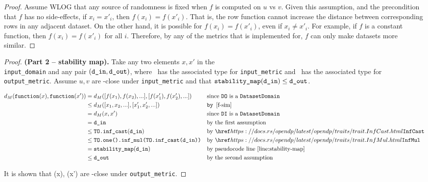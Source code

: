 \documentclass{article}
\begin{document}
\begin{proof} 
    Assume WLOG that any source of randomness is fixed when $f$ is computed on $u$ vs $v$. 
    Given this assumption, and the precondition that $f$ has no side-effects, 
    if $x_i = x'_i$, then $f(x_i) = f(x'_i)$.  
    That is, the row function cannot increase the distance between corresponding rows in any adjacent dataset. 
    On the other hand, it is possible for $f(x_i) = f(x'_i)$, even if $x_i \neq x'_i$. 
    For example, if $f$ is a constant function, then $f(x_i) = f(x'_i)$ for all $i$. 
    Therefore, by any of the metrics that  is implemented for, 
    $f$ can only make datasets more similar. 
\end{proof} 
 
\begin{proof} \textbf{(Part 2 -- stability map).}  
    Take any two elements $x, x'$ in the \\\texttt{input\_domain} and any pair $(\texttt{d\_in}, \texttt{d\_out})$,  
    where \din\ has the associated type for \texttt{input\_metric} and \dout\ has the associated type for \texttt{output\_metric}. 
    Assume $u, v$ are \din-close under \texttt{input\_metric} and that $\texttt{stability\_map}(\texttt{d\_in}) \leq \texttt{d\_out}$.  
     
    \begin{align*} 
        d_{M}(\function(x), \function(x')) &= d_{M}([f(x_1), f(x_2), ...], [f(x'_1), f(x'_2), ...])  && \text{since \texttt{DO} is a }\texttt{DatasetDomain}\\ 
        &\le d_{M}([x_1, x_2, ...], [x'_1, x'_2, ...]) && \texttt{by } \ref{f-sim} \\ 
        &= d_{M}(x, x')  && \text{since \texttt{DI} is a }\texttt{DatasetDomain} \\ 
        &= \din &&\text{by the first assumption} \\ 
        &\leq \texttt{TO.inf\_cast}(\din) &&\text{by } \rustdoc{traits/trait}{InfCast} \\ 
        &\leq \texttt{TO.one().inf\_mul(TO.inf\_cast(\din))} &&\text{by } \rustdoc{traits/trait}{InfMul} \\ 
        &=\texttt{stability\_map}(\din) &&\text{by pseudocode line } \ref{line:stability-map} \\ 
        &\leq \dout &&\text{by the second assumption} 
    \end{align*} 
 
    It is shown that \function(x), \function(x') are \dout-close under \texttt{output\_metric}. 
\end{proof} 
 
\end{document}
